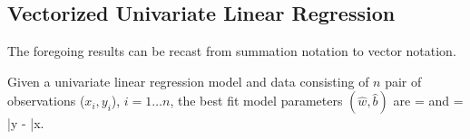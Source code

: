 \subsection{Vectorized Univariate Linear Regression}

The foregoing results can be recast from summation notation to 
vector notation.

\begin{Hresult}
Given 
a univariate linear regression model and data consisting of
$n$ pair of observations ($x_i, y_i$), $i=1\ldots n$, 
the best fit model parameters 
$(\hat{w}, \hat{b})$ are
\be
{} = 
  \label{eq:result_w_hat_vectorize}
\ee 
and
\be
{} = 
\bar{y} -  \; \bar{x}.
\label{eq:result_b_hat_vectorized}
\ee
\end{Hresult}

